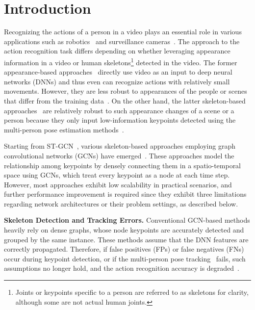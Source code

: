 \documentclass[10pt,twocolumn,letterpaper]{article}
\begin{document}
\section{Introduction}
\label{sec:intro}
Recognizing the actions of a person in a video plays an essential role in various applications such as robotics~\cite{Rodomagoulakis2016ICASSP,Lee2019IROS} and surveillance cameras~\cite{Su2020ECCV,Cheng2021ICPR,Islam2021IJCNN}.
The approach to the action recognition task differs depending on whether leveraging appearance information in a video or human skeletons\footnote{Joints or keypoints specific to a person are referred to as skeletons for clarity, although some are not actual human joints.} detected in the video.
The former appearance-based approaches~\cite{Simonyan2014Neurips,Ng2015CVPR,Tran2015ICCV,Feichtenhofer2016Neurips,Carreira2017CVPR,Tran2018CVPR,Xie2018ECCV,Feichtenhofer2019ICCV,Girdhar2019CVPR,Feichtenhofer2020CVPR,Duan2020ECCV,Islam2021IJCNN,Cheng2021ICPR,Arnab2021ICCV,Liu2022CVPR} directly use video as an input to deep neural networks (DNNs) and thus even can recognize actions with relatively small movements.
However, they are less robust to appearances of the people or scenes that differ from the training data~\cite{Weinzaepfel2021IJCV,Moon2021CVPR}.
On the other hand, the latter skeleton-based approaches~\cite{Sijie2018AAAI,Li2019CVPR,Liu2020CVPR,Zhang2020CVPR,Moon2021CVPR,Su2020ECCV,Chen2021ACMMM,Cai2021WACV,Chen2021AAAI,Duan2022CVPR,Chi2022CVPR} are relatively robust to such appearance changes of a scene or a person because they only input low-information keypoints detected using the multi-person pose estimation methods~\cite{Cao2017CVPR,Sekii2018ECCV,Sun2019CVPR}.

Starting from ST-GCN~\cite{Sijie2018AAAI}, various skeleton-based approaches employing graph convolutional networks (GCNs) have emerged~\cite{Shi2019CVPR,Liu2020CVPR,Cai2021WACV,Chen2021AAAI,Chen2021ACMMM,Chi2022CVPR}.
These approaches model the relationship among keypoints by densely connecting them in a spatio-temporal space using GCNs, which treat every keypoint as a node at each time step.
However, most approaches exhibit low scalability in practical scenarios, and further performance improvement is required since they exhibit three limitations regarding network architectures or their problem settings, as described below.

\noindent \textbf{Skeleton Detection and Tracking Errors.}
Conventional GCN-based methods heavily rely on dense graphs, whose node keypoints are accurately detected and grouped by the same instance.
These methods assume that the DNN features are correctly propagated.
Therefore, if false positives (FPs) or false negatives (FNs) occur during keypoint detection, or if the multi-person pose tracking~\cite{Snower2020CVPR,Rafi2020ECCV} fails, such assumptions no longer hold, and the action recognition accuracy is degraded~\cite{Zhu2019KDD,Duan2022CVPR}.
\end{document}
